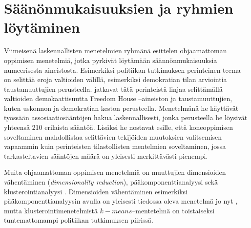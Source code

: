 \documentclass[finnish,gradu,twoside,12pt]{tktltiki}
\begin{document}
{\section{Säänönmukaisuuksien ja ryhmien löytäminen}
\label{unsupervised}

Viimeisenä laskennallisten menetelmien ryhmänä esittelen ohjaamattoman oppimisen menetelmiä, jotka pyrkivät löytämään säännönmukaisuuksia numeerisesta aineistosta. Esimerkiksi politiikan tutkimuksen perinteinen teema on selittää eroja valtioiden välillä, esimerkiksi demokratian tilan arviointia taustamuuttujien perusteella. \citet{Jurek2013} jatkavat tätä perinteistä linjaa selittämällä valtioiden demokaattisuutta Freedom House --aineiston ja taustamuuttujien, kuten uskonnon ja demokratian keston perusteella. Menetelmänä he käyttävät työssään assosiaatiosääntöjen hakua laskennallisesti, jonka perusteella he löysivät yhteensä 210 erilaista sääntöä. Lisäksi he nostavat esille, että koneoppimisen soveltaminen mahdollistaa selittävien tekijöiden muutoksien valitsemisen vapaammin kuin perinteisten tilastollisten mentelmien soveltaminen, jossa tarkasteltavien sääntöjen määrä on yleisesti merkittävästi pienempi.

Muita ohjaamattoman oppimisen menetelmiä on muuttujien dimensioiden vähentäminen (\textit{dimensionality reduction}), pääkomponenttianalyysi sekä klusterointianalyysi \citet[485--586]{Hastie2009}. Dimensioiden vähentäminen esimerkiksi pääkomponenttianalyysin avulla on yleisesti tiedossa oleva menetelmä jo nyt \citep[esimerkiksi][615--651]{metsamuuronen}, mutta klusterointimenetelmistä $k-means$--mentetelmä on toistaiseksi tuntemattomampi politiikan tutkimuksen piirissä.





}
\end{document}

